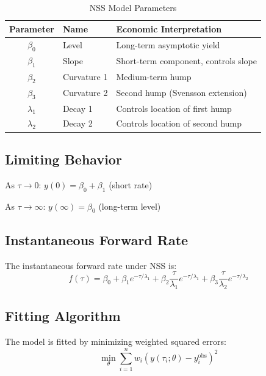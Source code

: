\documentclass[12pt,a4paper]{report}
\begin{document}
\begin{table}[H]
\centering
\begin{tabular}{@{}clp{8cm}@{}}
\toprule
\textbf{Parameter} & \textbf{Name} & \textbf{Economic Interpretation} \\
\midrule
$\beta_0$ & Level & Long-term asymptotic yield \\
$\beta_1$ & Slope & Short-term component, controls slope \\
$\beta_2$ & Curvature 1 & Medium-term hump \\
$\beta_3$ & Curvature 2 & Second hump (Svensson extension) \\
$\lambda_1$ & Decay 1 & Controls location of first hump \\
$\lambda_2$ & Decay 2 & Controls location of second hump \\
\bottomrule
\end{tabular}
\caption{NSS Model Parameters}
\end{table}

\subsection{Limiting Behavior}

As $\tau \to 0$: $y(0) = \beta_0 + \beta_1$ (short rate)

As $\tau \to \infty$: $y(\infty) = \beta_0$ (long-term level)

\subsection{Instantaneous Forward Rate}

The instantaneous forward rate under NSS is:
\begin{equation}
    f(\tau) = \beta_0 + \beta_1 e^{-\tau/\lambda_1} + \beta_2 \frac{\tau}{\lambda_1} e^{-\tau/\lambda_1} + \beta_3 \frac{\tau}{\lambda_2} e^{-\tau/\lambda_2}
\end{equation}

\subsection{Fitting Algorithm}

The model is fitted by minimizing weighted squared errors:
\begin{equation}
    \min_{\theta} \sum_{i=1}^{n} w_i \left( y(\tau_i; \theta) - y_i^{\text{obs}} \right)^2
\end{equation}
\end{document}
